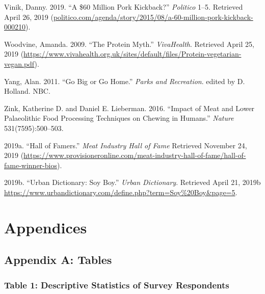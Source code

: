 \documentclass[twoside]{report}
\let\oldsection\section
\renewcommand\section{\clearpage\oldsection}
\begin{document}
\begin{multicols*}{2}
\hypertarget{vinik}{Vinik, Danny. 2019. ``A \$60 Million Pork Kickback?'' \emph{Politico}
1--5. Retrieved April 26, 2019
(\href{http://politico.com/agenda/story/2015/08/a-60-million-pork-kickback-000210}{politico.com/agenda/story/2015/08/a-60-million-pork-kickback-000210}).}

\hypertarget{woodvine}{Woodvine, Amanda. 2009. ``The Protein Myth.'' \emph{VivaHealth}.
Retrieved April 25, 2019
(\url{https://www.vivahealth.org.uk/sites/default/files/Protein-vegetarian-vegan.pdf}).}

\hypertarget{yang}{Yang, Alan. 2011. ``Go Big or Go Home.'' \emph{Parks and Recreation}.
edited by D. Holland. NBC.}

\hypertarget{zink}{Zink, Katherine D. and Daniel E. Lieberman. 2016. ``Impact of Meat and
Lower Palaeolithic Food Processing Techniques on Chewing in Humans.''
\emph{Nature} 531(7595):500--503.}

\hypertarget{2019a}{2019a. ``Hall of Famers.'' \emph{Meat Industry Hall of Fame} Retrieved November 24, 2019 (\url{https://www.provisioneronline.com/meat-industry-hall-of-fame/hall-of-fame-winner-bios}).} 

\hypertarget{2019b}{2019b. ``Urban Dictionary: Soy Boy.'' \emph{Urban Dictionary}.
Retrieved April 21, 2019b
{\url{https://www.urbandictionary.com/define.php?term=Soy\%20Boy\&page=5}}.}

\section{Appendices}

\hypertarget{appendix-a}{\subsection{Appendix A: Tables}}

\hypertarget{table-1}{\subsubsection[Table 1: Descriptive Statistics of \texorpdfstring{\\}{} Survey
Respondents]{Table 1: Descriptive Statistics of Survey
Respondents}}


\end{multicols*}
\end{document}
